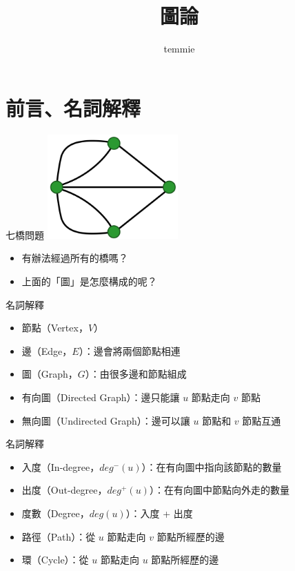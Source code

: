 \documentclass[mathserif]{beamer}
\title{圖論}
\author{temmie}
\date{}
\begin{document}
\begin{frame}
    \titlepage
\end{frame}

\begin{frame}
    \tableofcontents
\end{frame}

\section{前言、名詞解釋}

\begin{frame}{七橋問題}
    \includegraphics[width=5.0cm]{img/bridge.png}
    \begin{itemize}
        \item 有辦法經過所有的橋嗎？
        \item 上面的「圖」是怎麼構成的呢？
    \end{itemize}
\end{frame}

\begin{frame}{名詞解釋}
    \begin{itemize}
        \item 節點（Vertex，$V$）
        \item 邊（Edge，$E$）：邊會將兩個節點相連
        \item 圖（Graph，$G$）：由很多邊和節點組成
        \item 有向圖（Directed Graph）：邊只能讓 $u$ 節點走向 $v$ 節點
        \item 無向圖（Undirected Graph）：邊可以讓 $u$ 節點和 $v$ 節點互通
    \end{itemize}
\end{frame}

\begin{frame}{名詞解釋}
    \begin{itemize}
        \item 入度（In-degree，$deg^-(u)$）：在有向圖中指向該節點的數量
        \item 出度（Out-degree，$deg^+(u)$）：在有向圖中節點向外走的數量
        \item 度數（Degree，$deg(u)$）：入度 + 出度
        \item 路徑（Path）：從 $u$ 節點走向 $v$ 節點所經歷的邊
        \item 環（Cycle）：從 $u$ 節點走向 $u$ 節點所經歷的邊
    \end{itemize}
\end{frame}
\end{document}

